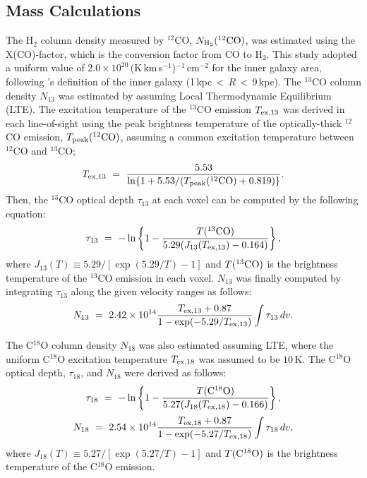 \documentclass[proof]{pasj01}
\begin{document}
\subsection{Mass Calculations}
The H$_2$ column density measured by $^{12}$CO, $N_{\rm H_2}({\rm ^{12}CO})$, was estimated using the X(CO)-factor, which is the conversion factor from CO to H$_2$. 
This study adopted a uniform value of $2.0\times10^{20}$\,(K\,km\,s$^{-1}$)$^{-1}$\,cm$^{-2}$ for the inner galaxy area, following \citet{bol2013}'s definition of the inner galaxy (1\,kpc\,$<\,R\,<$\,9\,kpc).
The $^{13}$CO column density $N_{13}$ was estimated by assuming Local Thermodynamic Equilibrium (LTE). 
The excitation temperature of the $^{13}$CO emission $T_{\rm ex, 13}$ was derived in each line-of-sight using the peak brightness temperature of the optically-thick $^{12}$CO emission,  $T_{\rm peak}(^{12}{\rm CO})$, assuming a common excitation temperature between $^{12}$CO and $^{13}$CO;
\begin{equation}
T_{\rm ex, 13}\ = \ \frac{5.53}{\ln\{ 1 + 5.53 / (T_{\rm peak}(^{12}{\rm CO}) + 0.819) \} }.\label{eq1}
\end{equation}
Then, the $^{13}$CO optical depth $\tau_{13}$ at each voxel can be computed by the following equation:
\begin{equation}
\tau_{13} \ = \ -\ln \left\{ 1 - \frac{T(^{13}{\rm CO})}{5.29 (J_{13}(T_{\rm ex, 13}) - 0.164) } \right\}, \label{eq2}
\end{equation}
where $J_{13}(T) \equiv 5.29 / [\exp (5.29/T) - 1]$ and $T(^{13}{\rm CO})$ is the brightness temperature of the $^{13}$CO emission in each voxel.
 $N_{13}$ was finally computed by integrating $\tau_{13}$ along the given velocity ranges as follows:
\begin{equation}
N_{13}\ = \ 2.42 \times 10^{14} \frac{T_{\rm ex, 13} + 0.87}{1- \exp(-5.29/T_{\rm ex, 13})} \int \tau_{13}\, dv. \label{eq3}
\end{equation}

The C$^{18}$O column density $N_{18}$ was also estimated assuming LTE, where the uniform C$^{18}$O excitation temperature $T_{\rm ex, 18}$ was assumed to be $10$\,K.
The C$^{18}$O optical depth, $\tau_{18}$, and $N_{18}$ were derived as follows:
\begin{equation}
\tau_{18} \ = \ -\ln \left\{ 1 - \frac{T({\rm C^{18}O})}{5.27 (J_{18}(T_{\rm ex, 18}) - 0.166) } \right\}, \label{eq4}
\end{equation}
\begin{equation}
N_{18} \ = \ 2.54 \times 10^{14} \frac{T_{\rm ex, 18} + 0.87}{1- \exp(-5.27/T_{\rm ex, 18})} \int \tau_{18} \, dv, \label{eq5}
\end{equation}
where $J_{18}(T) \equiv 5.27 / [\exp (5.27/T) - 1]$ and $T({\rm C^{18}O})$ is the brightness temperature of the C$^{18}$O emission.
\end{document}
